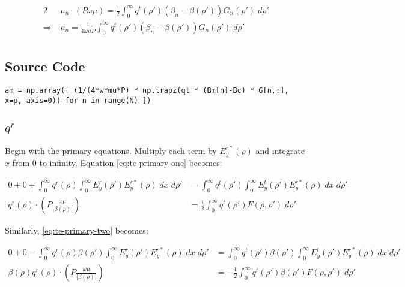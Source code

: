 \documentclass[11pt, oneside]{article}   	%
\begin{document}
\begin{align}
2 &a_{n} \cdot \left( P \omega \mu \right) = \frac{1}{2} \int_{0}^{\infty} q^{t} (\rho ') (\beta_{n} - \beta(\rho ')) G_{n} (\rho ') \; d\rho' \nonumber \\
\Rightarrow \; &a_{n} = \frac{1}{4 \omega \mu P} \int_{0}^{\infty} q^{t} (\rho ') (\beta_{n} - \beta(\rho ')) G_{n} (\rho ') \; d\rho' \\
\end{align}

\subsection{Source Code}

\begin{lstlisting}
am = np.array([ (1/(4*w*mu*P) * np.trapz(qt * (Bm[n]-Bc) * G[n,:], x=p, axis=0)) for n in range(N) ])
\end{lstlisting}



\subsection{$q^{r}$}

Begin with the primary equations. Multiply each term by $E_{y}^{r*}(\rho)$ and integrate $x$ from 0 to infinity. Equation \eqref{eq:te-primary-one} becomes:

\begin{align*}
0 + 0 + \int_{0}^{\infty} q^{r}(\rho) \int_{0}^{\infty} E_{y}^{r} (\rho ') E_{y}^{r*} (\rho) \; dx \; d\rho ' &= \int_{0}^{\infty} q^{t} (\rho ') \int_{0}^{\infty} E_{y}^{t}(\rho ') E_{y}^{r*}(\rho) \; dx \; d\rho ' \\
q^{r}(\rho) \cdot \left( P \frac{\omega \mu}{|\beta (\rho)|} \right) &= \frac{1}{2} \int_{0}^{\infty} q^{t} (\rho ') F(\rho, \rho') \; d\rho'
\end{align*}

\noindent Similarly, \eqref{eq:te-primary-two} becomes:

\begin{align*}
0 + 0 - \int_{0}^{\infty} q^{r}(\rho) \beta(\rho ') \int_{0}^{\infty} E_{y}^{r} (\rho ') E_{y}^{r*} (\rho) \; dx \; d\rho ' &= \int_{0}^{\infty} q^{t} (\rho ') \beta (\rho ') \int_{0}^{\infty} E_{y}^{t}(\rho ') E_{y}^{r*}(\rho) \; dx \; d\rho ' \\
\beta(\rho) q^{r}(\rho) \cdot \left( P \frac{\omega \mu}{|\beta (\rho)|} \right) &= -\frac{1}{2} \int_{0}^{\infty} q^{t} (\rho ') \beta (\rho ') F(\rho, \rho') \; d\rho'
\end{align*}
\end{document}

